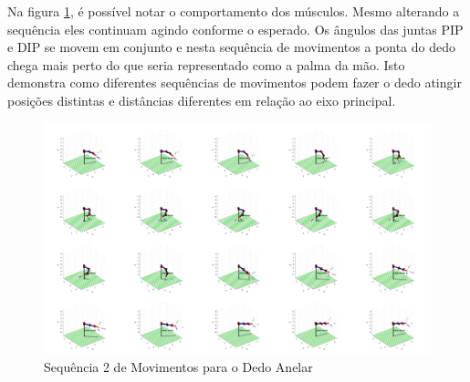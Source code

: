 Na figura \ref{simulacao_sequencia_2}, é possível notar o comportamento dos músculos. Mesmo alterando a sequência eles continuam agindo conforme o esperado. Os ângulos das juntas PIP e DIP se movem em conjunto e nesta sequência de movimentos a ponta do dedo chega mais perto do que seria representado como a palma da mão. Isto demonstra como diferentes sequências de movimentos podem fazer o dedo atingir posições distintas e distâncias diferentes em relação ao eixo principal.

\begin{figure}[H]
\centering
\includegraphics[width = 1\textwidth]{img/simulacao_sequencia_2.png}
\caption[Sequência 2 de Movimentos para o Dedo Anelar]{Sequência 2 de Movimentos para o Dedo Anelar}
\label{simulacao_sequencia_2}
\end{figure}